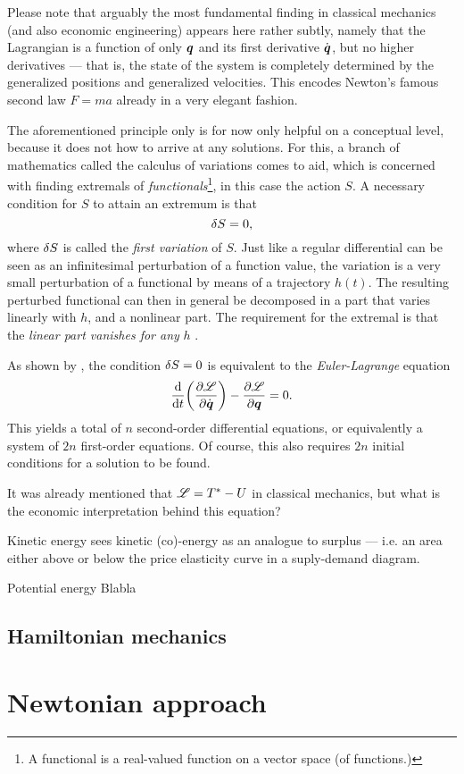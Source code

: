 Please note that arguably the most fundamental finding in classical mechanics (and also economic engineering) appears here rather subtly, namely that the Lagrangian is a function of only \(\vb*{q}\) and its first derivative \(\dot{\vb*{q}}\), but no higher derivatives --- that is, the state of the system is completely determined by the generalized positions and generalized velocities. This encodes Newton's famous second law \(F = ma\) already in a very elegant fashion.

The aforementioned principle only is for now only helpful on a conceptual level, because it does not how to arrive at any solutions. For this, a branch of mathematics called the calculus of variations comes to aid, which is concerned with finding extremals of \emph{functionals}\footnote{A functional is a real-valued function on a vector space (of functions.)}, in this case the action \(S\). A necessary condition for \(S\) to attain an extremum is that 
\[ \var{S} = 0,\]
where \(\var{S}\) is called the \emph{first variation} of \(S\). Just like a regular differential can be seen as an infinitesimal perturbation of a function value, the variation is a very small perturbation of a functional by means of a trajectory \(h(t)\). The resulting perturbed functional can then in general be decomposed in a part that varies linearly with \(h\), and a nonlinear part. The requirement for the extremal is that the \emph{linear part vanishes for any} \(h\) \cite{Arnold1989}.

As shown by \citet{Landau1976}, the condition \(\var{S} = 0\) is equivalent to the \emph{Euler-Lagrange} equation
\[ \dv{}{t}\qty(\pdv{\ensuremath{\mathscr{L}}}{\ensuremath{\dot{\vb*{q}}}}) - \pdv{\ensuremath{\mathscr{L}}}{\ensuremath{\vb*{q}}} = 0. \]
This yields a total of \(n\) second-order differential equations, or equivalently a system of \(2n\) first-order equations. Of course, this also requires \(2n\) initial conditions for a solution to be found.

It was already mentioned that \(\mathscr{L} = T^* - U\) in classical mechanics, but what is the economic interpretation behind this equation?
\begin{econ}{Kinetic energy}
    \citet{Mendel2019} sees kinetic (co)-energy as an analogue to surplus --- i.e. an area either above or below the price elasticity curve in a suply-demand diagram.
\end{econ}

\begin{econ}{Potential energy}
    Blabla
\end{econ}


\subsection{Hamiltonian mechanics}


\section{Newtonian approach}
